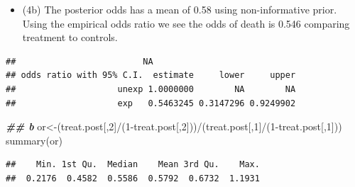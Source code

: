 \documentclass[
]{book}
\newenvironment{Shaded}{\begin{snugshade}}{\end{snugshade}}
\newcommand{\AttributeTok}[1]{\textcolor[rgb]{0.77,0.63,0.00}{#1}}
\newcommand{\DecValTok}[1]{\textcolor[rgb]{0.00,0.00,0.81}{#1}}
\newcommand{\DocumentationTok}[1]{\textcolor[rgb]{0.56,0.35,0.01}{\textbf{\textit{#1}}}}
\newcommand{\FunctionTok}[1]{\textcolor[rgb]{0.00,0.00,0.00}{#1}}
\newcommand{\NormalTok}[1]{#1}
\newcommand{\OtherTok}[1]{\textcolor[rgb]{0.56,0.35,0.01}{#1}}
\newcommand{\SpecialCharTok}[1]{\textcolor[rgb]{0.00,0.00,0.00}{#1}}
\newcommand{\StringTok}[1]{\textcolor[rgb]{0.31,0.60,0.02}{#1}}
\providecommand{\tightlist}{%
  \setlength{\itemsep}{0pt}\setlength{\parskip}{0pt}}
\theoremstyle{definition}
\theoremstyle{definition}
\theoremstyle{definition}
\theoremstyle{definition}
\theoremstyle{remark}
\begin{document}
\begin{itemize}
\tightlist
\item
  (4b) The posterior odds has a mean of 0.58 using non-informative prior. Using the empirical odds ratio we see the odds of death is 0.546 comparing treatment to controls.
\end{itemize}

\begin{Shaded}
\end{Shaded}

\begin{verbatim}
##                         NA
## odds ratio with 95% C.I.  estimate     lower     upper
##                    unexp 1.0000000        NA        NA
##                    exp   0.5463245 0.3147296 0.9249902
\end{verbatim}

\begin{Shaded}
\begin{Highlighting}[]
  \DocumentationTok{\#\# b}
\NormalTok{  or}\OtherTok{\textless{}{-}}\NormalTok{(treat.post[,}\DecValTok{2}\NormalTok{]}\SpecialCharTok{/}\NormalTok{(}\DecValTok{1}\SpecialCharTok{{-}}\NormalTok{treat.post[,}\DecValTok{2}\NormalTok{]))}\SpecialCharTok{/}\NormalTok{(treat.post[,}\DecValTok{1}\NormalTok{]}\SpecialCharTok{/}\NormalTok{(}\DecValTok{1}\SpecialCharTok{{-}}\NormalTok{treat.post[,}\DecValTok{1}\NormalTok{]))}
\FunctionTok{summary}\NormalTok{(or)}
\end{Highlighting}
\end{Shaded}

\begin{verbatim}
##    Min. 1st Qu.  Median    Mean 3rd Qu.    Max. 
##  0.2176  0.4582  0.5586  0.5792  0.6732  1.1931
\end{verbatim}
\end{document}
